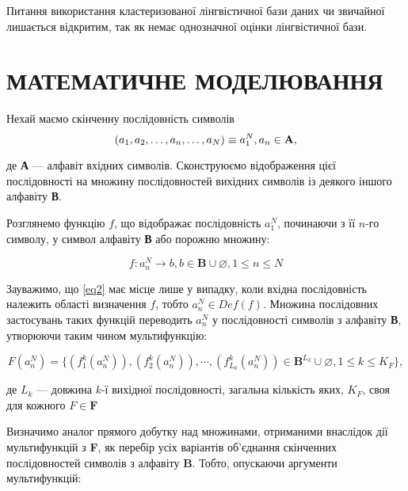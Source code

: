 \documentclass{diploma}
\begin{document}
Питання використання кластеризованої лінгвістичної бази даних чи звичайної лишається відкритим, так як немає однозначної оцінки лінгвістичної бази.









\newpage
\chapter{МАТЕМАТИЧНЕ МОДЕЛЮВАННЯ}

Нехай маємо скінченну послідовність символів
\begin{equation}
\label{eq1}
(a_1, a_2,\dots , a_n,\dots ,a_N)\equiv a_1^N, a_n\in \text{\textbf{A}},
\end{equation}

де \textbf{А} --- алфавіт вхідних символів. Сконструюємо відображення цієї послідовності на множину послідовностей вихідних символів із деякого іншого алфавіту \textbf{В}.

Розглянемо функцію $f$, що відображає послідовність  $a_1^N$, починаючи з її $n$-го символу, у символ алфавіту \textbf{В} або порожню множину:

\begin{equation}
\label{eq2}
f:a_n^N \rightarrow b, b\in \textbf{B} \cup \varnothing , 1\le n\le N  
\end{equation}

Зауважимо, що \eqref{eq2} має місце лише у випадку, коли вхідна послідовність належить області визначення $f$, тобто $a_n^N \in Def(f)$. Множина послідовних застосувань таких функцій переводить $a_n^N$ у послідовності символів з алфавіту \textbf{В}, утворюючи таким чином мультифункцію: 

\begin{equation}
\label{eq3}
F\left(a_n^N\right)= \{ \left(f_1^k(a_n^N)\right),\left(f_2^k(a_n^N)\right), \cdots ,\left(f_{L_k}^k(a_n^N)\right) \in \textbf{B}^{L_k} \cup \varnothing, 1\leqslant k \leqslant K_F \},
\end{equation}

де $L_k$ --- довжина $k$-ї вихідної послідовності, загальна кількість яких, $K_F$, своя для кожного  $F\in \textbf{F}$

Визначимо аналог прямого добутку над множинами, отриманими внаслідок дії мультифункцій з \textbf{F}, як перебір усіх варіантів об'єднання скінченних послідовностей символів з алфавіту \textbf{B}. Тобто, опускаючи аргументи мультифункцій:
\end{document}

